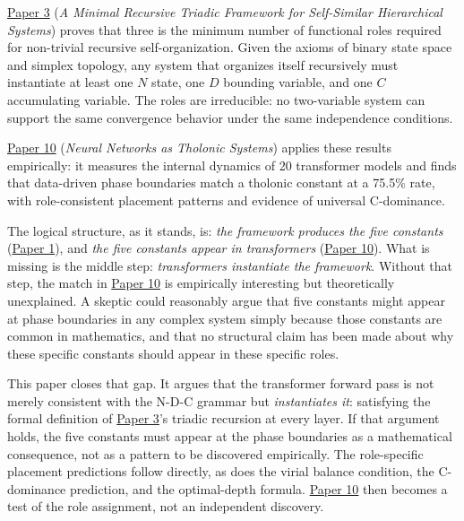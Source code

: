\documentclass[12pt]{article}
\begin{document}
\href{https://github.com/baardev/truevalue/blob/main/docnav/Research/papers/3_minimal-recursive-triadic-framework/3_minimal-recursive-triadic-framework.pdf}{Paper
3} (\emph{A Minimal Recursive Triadic Framework for Self-Similar
Hierarchical Systems}) proves that three is the minimum number of
functional roles required for non-trivial recursive self-organization.
Given the axioms of binary state space and simplex topology, any system
that organizes itself recursively must instantiate at least one \(N\)
state, one \(D\) bounding variable, and one \(C\) accumulating variable.
The roles are irreducible: no two-variable system can support the same
convergence behavior under the same independence conditions.

\href{https://github.com/baardev/truevalue/blob/main/docnav/Research/papers/10_tholonic-neural-architecture/10_tholonic-neural-architecture.pdf}{Paper
10} (\emph{Neural Networks as Tholonic Systems}) applies these results
empirically: it measures the internal dynamics of 20 transformer models
and finds that data-driven phase boundaries match a tholonic constant at
a 75.5\% rate, with role-consistent placement patterns and evidence of
universal C-dominance.

The logical structure, as it stands, is: \emph{the framework produces
the five constants}
(\href{https://github.com/baardev/truevalue/blob/main/docnav/Research/papers/1_recursive-tholonic-five-constants/1_recursive-tholonic-five-constants.pdf}{Paper
1}), and \emph{the five constants appear in transformers}
(\href{https://github.com/baardev/truevalue/blob/main/docnav/Research/papers/10_tholonic-neural-architecture/10_tholonic-neural-architecture.pdf}{Paper
10}). What is missing is the middle step: \emph{transformers instantiate
the framework}. Without that step, the match in
\href{https://github.com/baardev/truevalue/blob/main/docnav/Research/papers/10_tholonic-neural-architecture/10_tholonic-neural-architecture.pdf}{Paper
10} is empirically interesting but theoretically unexplained. A skeptic
could reasonably argue that five constants might appear at phase
boundaries in any complex system simply because those constants are
common in mathematics, and that no structural claim has been made about
why these specific constants should appear in these specific roles.

This paper closes that gap. It argues that the transformer forward pass
is not merely consistent with the N-D-C grammar but \emph{instantiates
it}: satisfying the formal definition of
\href{https://github.com/baardev/truevalue/blob/main/docnav/Research/papers/3_minimal-recursive-triadic-framework/3_minimal-recursive-triadic-framework.pdf}{Paper
3}'s triadic recursion at every layer. If that argument holds, the five
constants must appear at the phase boundaries as a mathematical
consequence, not as a pattern to be discovered empirically. The
role-specific placement predictions follow directly, as does the virial
balance condition, the C-dominance prediction, and the optimal-depth
formula.
\href{https://github.com/baardev/truevalue/blob/main/docnav/Research/papers/10_tholonic-neural-architecture/10_tholonic-neural-architecture.pdf}{Paper
10} then becomes a test of the role assignment, not an independent
discovery.
\end{document}
